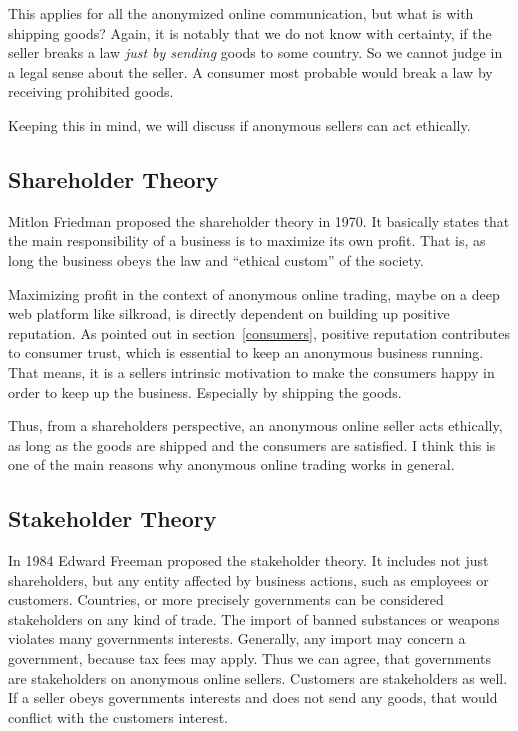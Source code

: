 This applies for all the anonymized online communication, but what is with shipping goods? Again, it is notably that we do not know with certainty, if the seller breaks a law \emph{just by sending} goods to some country. So we cannot judge in a legal sense about the seller. A consumer most probable would break a law by receiving prohibited goods.

Keeping this in mind, we will discuss if anonymous sellers can act ethically.

\subsection{Shareholder Theory}

Mitlon Friedman proposed the shareholder theory in 1970. It basically states that the main responsibility of a business is to maximize its own profit. That is, as long the business obeys the law and ``ethical custom'' of the society\cite{shareholder}. 

Maximizing profit in the context of anonymous online trading, maybe on a deep web platform like silkroad, is directly dependent on building up positive reputation. As pointed out in section~\ref{consumers}, positive reputation contributes to consumer trust, which is essential to keep an anonymous business running. That means, it is a sellers intrinsic motivation to make the consumers happy in order to keep up the business. Especially by shipping the goods.

Thus, from a shareholders perspective, an anonymous online seller acts ethically, as long as the goods are shipped and the consumers are satisfied. I think this is one of the main reasons why anonymous online trading works in general.

\subsection{Stakeholder Theory}

In 1984 Edward Freeman proposed the stakeholder theory\cite{stakeholder}. It includes not just shareholders, but any entity affected by business actions, such as employees or customers. Countries, or more precisely governments can be considered stakeholders on any kind of trade. The import of banned substances or weapons violates many governments interests. Generally, any import may concern a government, because tax fees may apply. Thus we can agree, that governments are stakeholders on anonymous online sellers. Customers are stakeholders as well. If a seller obeys governments interests and does not send any goods, that would conflict with the customers interest.

